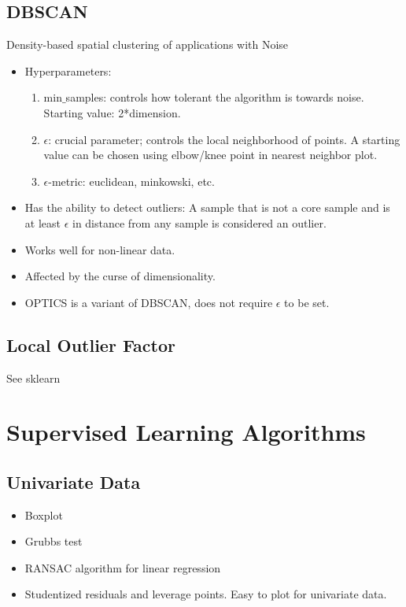 \documentclass[a4paper, 12pt]{report}
\begin{document}
\section{DBSCAN}
Density-based spatial clustering of applications with Noise
\begin{itemize}
\item Hyperparameters: 
\begin{enumerate}
\item min$\_$samples: controls how tolerant the algorithm is towards noise. Starting value: 2*dimension.
\item$\epsilon$: crucial parameter; controls the local neighborhood of points. A starting value can be chosen using elbow/knee point in nearest neighbor plot.
\item $\epsilon$-metric: euclidean, minkowski, etc.
\end{enumerate}
\item Has the ability to detect outliers: A sample that is not a core sample and is at least $\epsilon$ in distance from any sample is considered an outlier.
\item Works well for non-linear data.
\item Affected by the curse of dimensionality.
\item OPTICS is a variant of DBSCAN, does not require $\epsilon$ to be set.
\end{itemize}

\section{Local Outlier Factor}
See sklearn



\chapter{Supervised Learning Algorithms}

\section{Univariate Data}
\begin{itemize}
\item Boxplot
\item Grubbs test
\item RANSAC algorithm for linear regression
\item Studentized residuals and leverage points. Easy to plot for univariate data.
\end{itemize}
\end{document}

